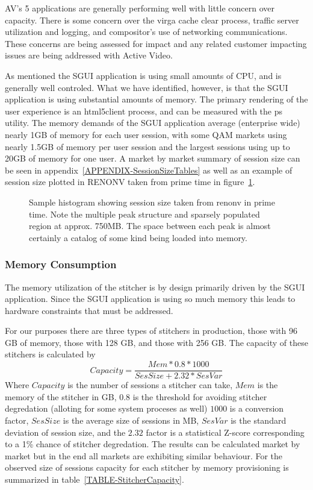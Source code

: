\documentclass{article}
\begin{document}
AV's 5 applications are generally performing well with little concern over capacity. There is some concern over the virga cache clear process, traffic server utilization and logging, and compositor's use of networking communications. These concerns are being assessed for impact and any related customer impacting issues are being addressed with Active Video. 

As mentioned the SGUI application is using small amounts of CPU, and is generally well controled. What we have identified, however, is that the SGUI application is using substantial amounts of memory. The primary rendering of the user experience is an html5client process, and can be measured with the ps utility. The memory demands of the SGUI application average (enterprise wide) nearly 1GB of memory for each user session, with some QAM markets using nearly 1.5GB of memory per user session and the largest sessions using up to 20GB of memory for one user. A market by market summary of session size can be seen in appendix~\ref{APPENDIX-SessionSizeTables} as well as an example of session size plotted in RENONV taken from prime time in figure~\ref{FIGURE-SessionSizeMem}.

\begin{figure}[!htb]
        \caption{\label{FIGURE-SessionSizeMem} Sample histogram showing session size taken from renonv in prime time. Note the multiple peak structure and sparsely populated region at approx. 750MB. The space between each peak is almost certainly a catalog of some kind being loaded into memory.}
\end{figure}

\subsubsection{Memory Consumption}
\label{SECTION-Memory}

The memory utilization of the stitcher is by design primarily driven by the SGUI application. Since the SGUI application is using so much memory this leads to hardware constraints that must be addressed. 

For our purposes there are three types of stitchers in production, those with 96 GB of memory, those with 128 GB, and those with 256 GB. The capacity of these stitchers is calculated by $$Capacity=\frac{Mem * 0.8 * 1000}{SesSize + 2.32*SesVar}$$ Where $Capacity$ is the number of sessions a stitcher can take, $Mem$ is the memory of the stitcher in GB, $0.8$ is the threshold for avoiding stitcher degredation (alloting for some system proceses as well) $1000$ is a conversion factor, $SesSize$ is the average size of sessions in MB, $SesVar$ is the standard deviation of session size, and the $2.32$ factor is a statistical Z-score corresponding to a 1\% chance of stitcher degredation. The results can be calculated market by market but in the end all markets are exhibiting similar behaviour. For the observed size of sessions capacity for each stitcher by memory provisioning is summarized in table~\ref{TABLE-StitcherCapacity}.
\end{document}
